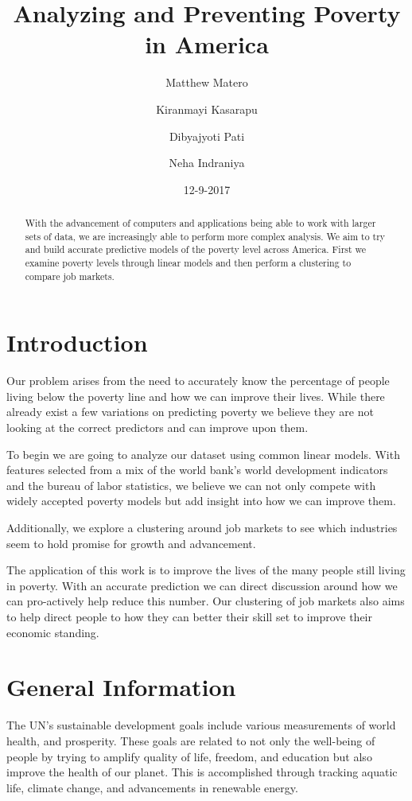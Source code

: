 \documentclass[11pt,letterpaper]{article}
\title{Analyzing and Preventing Poverty in America}
\author{Matthew Matero \and Kiranmayi Kasarapu \and Dibyajyoti Pati \and Neha  Indraniya}
\date{12-9-2017}
\begin{document}
\maketitle

\begin{abstract}
 With the advancement of computers and applications being able to work with larger sets of data, we are increasingly able to perform more complex analysis. We aim to try and build accurate predictive models of the poverty level across America. First we examine poverty levels through linear models and then perform a clustering to compare job markets. 
\end{abstract}

\section{Introduction}

Our problem arises from the need to accurately know the percentage of people living below the poverty line and how we can improve their lives. While there already exist a few variations on predicting poverty we believe they are not looking at the correct predictors and can improve upon them.

To begin we are going to analyze our dataset using common linear models. With features selected from a mix of the world bank's world development indicators and the bureau of labor statistics, we believe we can not only compete with widely accepted poverty models but add insight into how we can improve them.

Additionally, we explore a clustering around job markets to see which industries seem to hold promise for growth and advancement. 
 
The application of this work is to improve the lives of the many people still living in poverty. With an accurate prediction we can direct discussion around how we can pro-actively help reduce this number. Our clustering of job markets also aims to help direct people to how they can better their skill set to improve their economic standing. 

\section{General Information}

The UN's sustainable development goals include various measurements of world health, and prosperity\cite{UNSDG}. 
These goals are related to not only the well-being of people by trying to amplify quality of life, freedom, and education but also improve the health of our planet. This is accomplished through tracking aquatic life, climate change, and advancements in renewable energy. 
\end{document}
